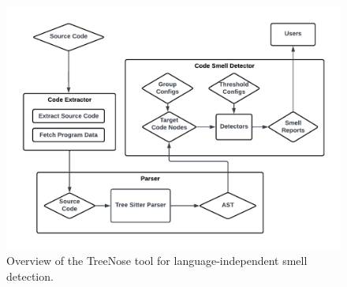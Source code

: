 \begin{figure}[t]
    \centering
    \includegraphics[width=\columnwidth]{graphics/Architecture.pdf}
    \vspace*{-2em}
    \caption{
        \label{fig:architecture}
        Overview of the TreeNose tool for language-independent smell detection.
    }
    \vspace*{-1em}
\end{figure}

